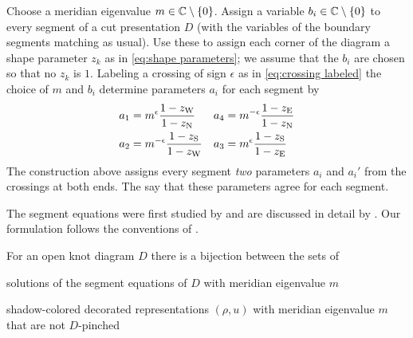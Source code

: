 \documentclass[margincite, leqno]{sl2art}
\numberwithin{equation}{section}
\begin{document}
\begin{definition}
  \label{def:segment equations}
  Choose a meridian eigenvalue \(m \in \mathbb{C} \setminus \set{0}\).
  Assign a variable \(b_{i} \in \mathbb{C} \setminus \set{0}\) to
  every segment of a cut presentation \(D\) (with the variables of
  the boundary segments matching as usual).
  Use these to assign each corner of the diagram a shape parameter
  \(z_{k}\) as in \cref{eq:shape parameters}; we assume that the
  \(b_{i}\) are chosen so that no \(z_{k}\) is \(1\).
  Labeling a crossing of sign \(\epsilon\) as in \eqref{eq:crossing
  labeled} the choice of \(m\) and \(b_{i}\) determine parameters
  \(a_{i}\) for each segment%
  by
  \begin{equation}
    \label{eq:segment a vars}
    \begin{aligned}
      a_{1}
      &=
      m^{\epsilon}
      \frac{
        1 - z_{\mathrm{W}}
      }{
        1 - z_{\mathrm{N}}
      }
      &
      a_{4}
      &=
      m^{-\epsilon}
      \frac{
        1 - z_{\mathrm{E}}
      }{
        1 - z_{\mathrm{N}}
      }
      \\
      a_{2}
      &=
      m^{-\epsilon}
      \frac{
        1 - z_{\mathrm{S}}
      }{
        1 - z_{\mathrm{W}}
      }
      &
      a_{3}
      &=
      m^{\epsilon}
      \frac{
        1 - z_{\mathrm{S}}
      }{
        1 - z_{\mathrm{E}}
      }
    \end{aligned}
  \end{equation}
  The construction above assigns every segment \emph{two} parameters
  \(a_{i}\) and \(a_{i}'\) from the crossings at both ends.
  The  say that these parameters agree for
  each segment.
\end{definition}

The segment equations were first studied by
\textcite{arXiv:math/0009165} and are discussed in detail by \textcite{Kim2018}.
Our formulation follows the conventions of
\cite{McphailSnyder2022hyperbolicstructureslinkcomplements,McphailSnyder2024octahedralcoordinateswirtingerpresentation}.

\begin{proposition}
  \label{thm:segment solutions are reps}
  For an open knot diagram \(D\) there is a bijection between the sets of
  \begin{thmenum}
  \item solutions of the segment equations of \(D\) with meridian
    eigenvalue \(m\)
  \item shadow-colored decorated representations \((\rho, u)\) with
    meridian eigenvalue \(m\) that are not \(D\)-pinched
    \qedhere
  \end{thmenum}
\end{proposition}
\end{document}
